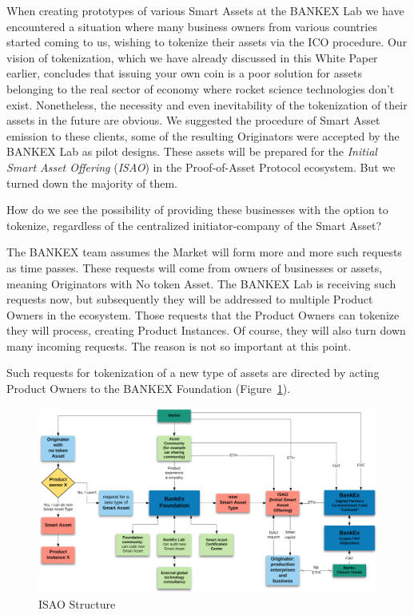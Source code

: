 \documentclass{article}
\begin{document}
\begin{multicols}{2}
When creating prototypes of various Smart Assets at the BANKEX Lab we have encountered a situation where many business owners from various countries started coming to us, wishing to tokenize their assets via the ICO procedure. Our vision of tokenization, which we have already discussed in this White Paper earlier, concludes that issuing your own coin is a poor solution for assets belonging to the real sector of economy where rocket science technologies don’t exist. Nonetheless, the necessity and even inevitability of the tokenization of their assets in the future are obvious. We suggested the procedure of Smart Asset emission to these clients, some of the resulting Originators were accepted by the BANKEX Lab as pilot designs. These assets will be prepared for the \textit{Initial Smart Asset Offering} (\textit{ISAO}) in the Proof-of-Asset Protocol ecosystem. But we turned down the majority of them.

How do we see the possibility of providing these businesses with the option to tokenize, regardless of the centralized initiator-company of the Smart Asset?

The BANKEX team assumes the Market will form more and more such requests as time passes. These requests will come from owners of businesses or assets, meaning Originators with No token Asset. The BANKEX Lab is receiving such requests now, but subsequently they will be addressed to multiple Product Owners in the ecosystem. Those requests that the Product Owners can tokenize they will process, creating Product Instances. Of course, they will also turn down many incoming requests. The reason is not so important at this point.

Such requests for tokenization of a new type of assets are directed by acting Product Owners to the BANKEX Foundation (Figure~\ref{fig:isao}). 

\begin{figure}
  \centering
  \includegraphics[width=\textwidth]{isao}
  \caption{ISAO Structure}
  \label{fig:isao}
\end{figure}


\end{multicols}
\end{document}
